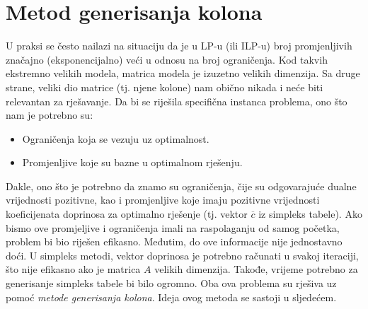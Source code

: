 \documentclass[a4paper, utf8, 11pt, colorlinks]{book}
\theoremstyle{definition}
\begin{document}
\section{Metod generisanja kolona}%

U praksi se često nailazi  na situaciju da je u LP-u (ili ILP-u) broj promjenljivih značajno (eksponencijalno) veći  u odnosu na broj ograničenja. Kod takvih ekstremno velikih modela, matrica modela je izuzetno velikih dimenzija. Sa druge strane, veliki dio matrice (tj. njene kolone) nam obično nikada i neće biti relevantan za rješavanje. Da bi se riješila specifična instanca problema, ono što nam je potrebno su:
\begin{itemize}
    \item Ograničenja koja se vezuju uz optimalnost.
    \item Promjenljive koje su bazne u optimalnom rješenju.
\end{itemize}
Dakle, ono što je potrebno da znamo su ograničenja, čije su odgovarajuće dualne vrijednosti pozitivne, kao i promjenljive koje imaju pozitivne vrijednosti koeficijenata doprinosa za optimalno rješenje (tj. vektor  $\overline{c}$ iz simpleks tabele). Ako bismo  ove promjeljive i ograničenja imali na raspolaganju od samog početka, problem bi bio riješen efikasno. Međutim, do ove informacije nije jednostavno doći.  U simpleks metodi, vektor doprinosa je potrebno računati u svakoj iteraciji, što nije efikasno ako je matrica $A$ velikih dimenzija. Takođe, vrijeme potrebno za generisanje simpleks tabele bi bilo ogromno.  Oba ova problema su rješiva uz pomoć \emph{metode generisanja kolona}.  Ideja ovog metoda se sastoji u sljedećem. 
 
\end{document}
